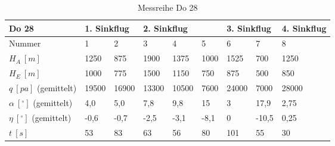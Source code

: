 \begin{table}[h]
\begin{tabular}{|l|l|l|l|l|l|l|l|l|}
\hline
Do 28                     & \multicolumn{2}{l|}{1. Sinkflug} & \multicolumn{3}{l|}{2. Sinkflug} & \multicolumn{2}{l|}{3. Sinkflug} & 4. Sinkflug \\ \hline
Nummer & 1               & 2              & 3         & 4         & 5        & 6               & 7              & 8           \\ \hline
$H_A\ [m]$              & 1250            & 875            & 1900      & 1375      & 1000     & 1525            & 700            & 1250        \\ \hline
$H_E\ [m]$              & 1000            & 775            & 1500      & 1150      & 750      & 875             & 500            & 850         \\ \hline
$q\ [pa]$ (gemittelt)    & 19500           & 16900          & 13300     & 10500     & 7600     & 24000           & 7000           & 28000       \\ \hline
$\alpha\ [^\circ]$  (gemittelt) & 4,0             & 5,0            & 7,8       & 9,8       & 15       & 3               & 17,9           & 2,75        \\ \hline
$\eta\ [^\circ]$ (gemittelt)   & -0,6            & -0,7           & -2,5      & -3,1      & -8,1     & 0               & -10,5         & 0,25        \\ \hline
$t\ [s]$                 & 53              & 83             & 63        & 56        & 80       & 101             & 55             & 30          \\ \hline
\end{tabular}
\caption{Messreihe Do 28}
	\label{tab:VersuchDaten4}
\end{table}
